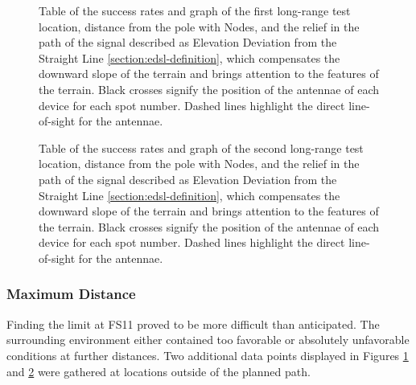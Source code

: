 \begin{figure}[p]
    \centering
    \begin{minipage}[t]{\textwidth}
        \centering
        
        \vspace{1em}
    \end{minipage}
    
    \caption{\label{fig:range-relief-far1}Table of the success rates and graph of the first long-range test location, distance from the pole with Nodes, and the relief in the path of the signal described as Elevation Deviation from the Straight Line \ref{section:edsl-definition}, which compensates the downward slope of the terrain and brings attention to the features of the terrain. Black crosses signify the position of the antennae of each device for each spot number. Dashed lines highlight the direct line-of-sight for the antennae.}
\end{figure}

\begin{figure}[p]
    \centering
    \begin{minipage}[t]{\textwidth}
        \centering
        
        \vspace{1em}
    \end{minipage}
    
    \caption{\label{fig:range-relief-far2}Table of the success rates and graph of the second long-range test location, distance from the pole with Nodes, and the relief in the path of the signal described as Elevation Deviation from the Straight Line \ref{section:edsl-definition}, which compensates the downward slope of the terrain and brings attention to the features of the terrain. Black crosses signify the position of the antennae of each device for each spot number. Dashed lines highlight the direct line-of-sight for the antennae.}
\end{figure}

\subsubsection{Maximum Distance}
Finding the limit at FS11 proved to be more difficult than anticipated. The surrounding environment either contained too favorable or absolutely unfavorable conditions at further distances. Two additional data points displayed in Figures \ref{fig:range-relief-far1} and \ref{fig:range-relief-far2} were gathered at locations outside of the planned path.

